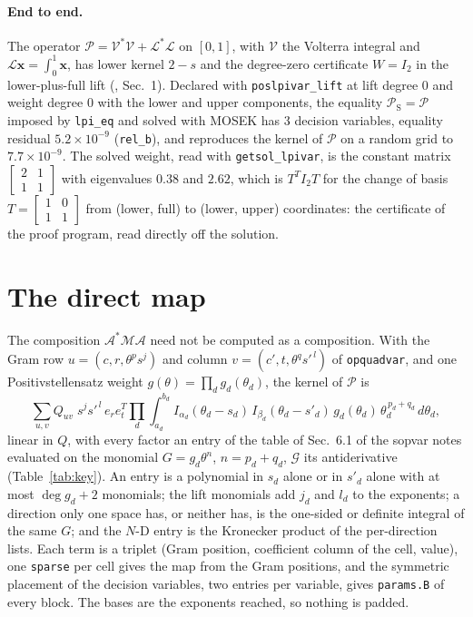 \documentclass[12pt]{article}
\newcommand{\mcl}[1]{\mathcal{#1}}
\newcommand{\mbf}[1]{\mathbf{#1}}
\newcommand{\bmat}[1]{\begin{bmatrix} #1 \end{bmatrix}}
\newcommand{\code}[1]{\texttt{#1}}
\newcommand{\file}[1]{\path{#1}}      %
\theoremstyle{plain}
\theoremstyle{definition}
\theoremstyle{remark}
\begin{document}
\paragraph{End to end.} The operator $\mcl P=\mcl V^*\mcl V+\mcl L^*\mcl L$ on $[0,1]$, with $\mcl V$ the Volterra integral and $\mcl L\mbf x=\int_0^1\mbf x$, has lower kernel $2-s$ and the degree-zero certificate $W=I_2$ in the lower-plus-full lift (\file{scalar_rank_one_weight_obstruction.md}, Sec.~1). Declared with \code{poslpivar\_lift} at lift degree $0$ and weight degree $0$ with the lower and upper components, the equality $\mcl P_{\mathrm S}=\mcl P$ imposed by \code{lpi\_eq} and solved with MOSEK has $3$ decision variables, equality residual $5.2\times10^{-9}$ (\code{rel\_b}), and reproduces the kernel of $\mcl P$ on a random grid to $7.7\times10^{-9}$. The solved weight, read with \code{getsol\_lpivar}, is the constant matrix $\bmat{2&1\\1&1}$ with eigenvalues $0.38$ and $2.62$, which is $T^TI_2T$ for the change of basis $T=\bmat{1&0\\1&1}$ from (lower, full) to (lower, upper) coordinates: the certificate of the proof program, read directly off the solution.

\section{The direct map}\label{sec:direct}

The composition $\mcl A^*\mcl M\mcl A$ need not be computed as a composition. With the Gram row $u=(c,r,\theta^p s^j)$ and column $v=(c',t,\theta^q s'^{\,l})$ of \code{opquadvar}, and one Positivstellensatz weight $g(\theta)=\prod_d g_d(\theta_d)$, the kernel of $\mcl P$ is
\begin{equation}\label{eq:direct}
\sum_{u,v} Q_{uv}\; s^{j} s'^{\,l}\, e_r e_t^{T} \prod_{d}\int_{a_d}^{b_d} I_{\alpha_d}(\theta_d-s_d)\, I_{\beta_d}(\theta_d-s'_d)\, g_d(\theta_d)\,\theta_d^{\,p_d+q_d}\, d\theta_d ,
\end{equation}
linear in $Q$, with every factor an entry of the table of Sec.~6.1 of the sopvar notes evaluated on the monomial $G=g_d\theta^n$, $n=p_d+q_d$, $\mcl G$ its antiderivative (Table~\ref{tab:key}). An entry is a polynomial in $s_d$ alone or in $s'_d$ alone with at most $\deg g_d+2$ monomials; the lift monomials add $j_d$ and $l_d$ to the exponents; a direction only one space has, or neither has, is the one-sided or definite integral of the same $G$; and the $N$-D entry is the Kronecker product of the per-direction lists. Each term is a triplet (Gram position, coefficient column of the cell, value), one \code{sparse} per cell gives the map from the Gram positions, and the symmetric placement of the decision variables, two entries per variable, gives \code{params.B} of every block. The bases are the exponents reached, so nothing is padded.
\end{document}
